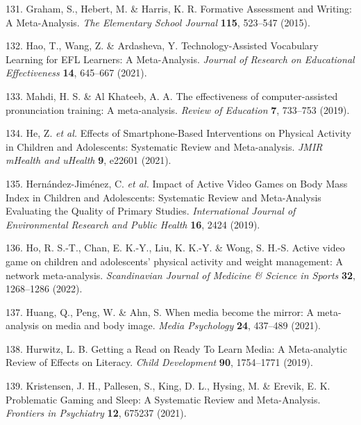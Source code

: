 \documentclass[
  english,
  man]{apa6}
\newenvironment{cslreferences}%
  {}%
  {\par}
\begin{document}
\begin{cslreferences}
\leavevmode\hypertarget{ref-grahamFormativeAssessmentWriting2015}{}%
131. Graham, S., Hebert, M. \& Harris, K. R. Formative Assessment and Writing: A Meta-Analysis. \emph{The Elementary School Journal} \textbf{115}, 523--547 (2015).

\leavevmode\hypertarget{ref-haoTechnologyAssistedVocabularyLearning2021}{}%
132. Hao, T., Wang, Z. \& Ardasheva, Y. Technology-Assisted Vocabulary Learning for EFL Learners: A Meta-Analysis. \emph{Journal of Research on Educational Effectiveness} \textbf{14}, 645--667 (2021).

\leavevmode\hypertarget{ref-mahdiEffectivenessComputerAssisted2019}{}%
133. Mahdi, H. S. \& Al Khateeb, A. A. The effectiveness of computer-assisted pronunciation training: A meta-analysis. \emph{Review of Education} \textbf{7}, 733--753 (2019).

\leavevmode\hypertarget{ref-heEffectsSmartphoneBasedInterventions2021}{}%
134. He, Z. \emph{et al.} Effects of Smartphone-Based Interventions on Physical Activity in Children and Adolescents: Systematic Review and Meta-analysis. \emph{JMIR mHealth and uHealth} \textbf{9}, e22601 (2021).

\leavevmode\hypertarget{ref-hernandez-jimenezImpactActiveVideo2019}{}%
135. Hernández-Jiménez, C. \emph{et al.} Impact of Active Video Games on Body Mass Index in Children and Adolescents: Systematic Review and Meta-Analysis Evaluating the Quality of Primary Studies. \emph{International Journal of Environmental Research and Public Health} \textbf{16}, 2424 (2019).

\leavevmode\hypertarget{ref-hoActiveVideoGame2022}{}%
136. Ho, R. S.-T., Chan, E. K.-Y., Liu, K. K.-Y. \& Wong, S. H.-S. Active video game on children and adolescents' physical activity and weight management: A network meta-analysis. \emph{Scandinavian Journal of Medicine \& Science in Sports} \textbf{32}, 1268--1286 (2022).

\leavevmode\hypertarget{ref-huangWhenMediaBecome2021}{}%
137. Huang, Q., Peng, W. \& Ahn, S. When media become the mirror: A meta-analysis on media and body image. \emph{Media Psychology} \textbf{24}, 437--489 (2021).

\leavevmode\hypertarget{ref-hurwitzGettingReadReady2019}{}%
138. Hurwitz, L. B. Getting a Read on Ready To Learn Media: A Meta-analytic Review of Effects on Literacy. \emph{Child Development} \textbf{90}, 1754--1771 (2019).

\leavevmode\hypertarget{ref-kristensenProblematicGamingSleep2021}{}%
139. Kristensen, J. H., Pallesen, S., King, D. L., Hysing, M. \& Erevik, E. K. Problematic Gaming and Sleep: A Systematic Review and Meta-Analysis. \emph{Frontiers in Psychiatry} \textbf{12}, 675237 (2021).


\end{cslreferences}
\end{document}
